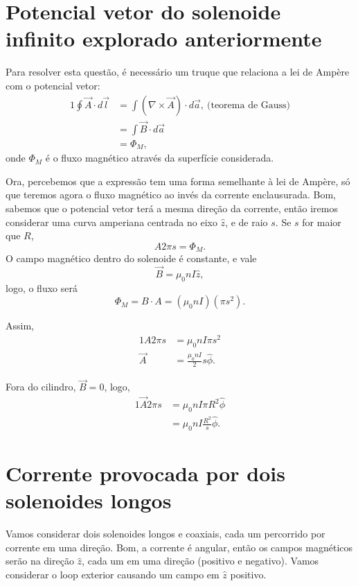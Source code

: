 \documentclass{article}
\begin{document}
\section{Potencial vetor do solenoide infinito explorado anteriormente}
Para resolver esta questão, é necessário um truque que relaciona a lei de Ampère com o potencial vetor:
\begin{alignat}{1}
 \oint \vec{A}\cdot d\vec{l} &= \int (\nabla \times \vec{A}) \cdot d\vec{a},\ \text{(teorema de Gauss)}\\
 &= \int \vec{B} \cdot d\vec{a}\\
 &= \Phi_M,
\end{alignat}
onde $\Phi_M$ é o fluxo magnético através da superfície considerada.

Ora, percebemos que a expressão tem uma forma semelhante à lei de Ampère, só que teremos agora o fluxo magnético ao invés da corrente enclausurada. Bom, sabemos que o
potencial vetor terá a mesma direção da corrente, então iremos considerar uma curva amperiana centrada no eixo $\hat{z}$, e de raio $s$. Se $s$ for maior que $R$,
\begin{equation}
 A 2\pi s = \Phi_M.
\end{equation}
O campo magnético dentro do solenoide é constante, e vale
\begin{equation}
 \vec{B} = \mu_0 n I \hat{z},
\end{equation}
logo, o fluxo será
\begin{equation}
 \Phi_M = B\cdot A = (\mu_0 n I) (\pi s^2).
\end{equation}

Assim,
\begin{alignat}{1}
 A 2\pi s &= \mu_0 n I \pi s^2\\
 \vec{A} &= \frac{\mu_0 n I}{2}s \hat{\phi}.
\end{alignat}

Fora do cilindro, $\vec{B} = 0$, logo,
\begin{alignat}{1}
 \vec{A}2\pi s &= \mu_0 n I \pi R^2 \hat{\phi}\\
 &= \mu_0 n I \frac{R^2}{s} \hat{\phi}.
\end{alignat}

\section{Corrente provocada por dois solenoides longos}
Vamos considerar dois solenoides longos e coaxiais, cada um percorrido por corrente em uma direção. Bom, a corrente é angular, então os campos magnéticos serão na direção
$\hat{z}$, cada um em uma direção (positivo e negativo). Vamos considerar o loop exterior causando um campo em $\hat{z}$ positivo.
\end{document}
